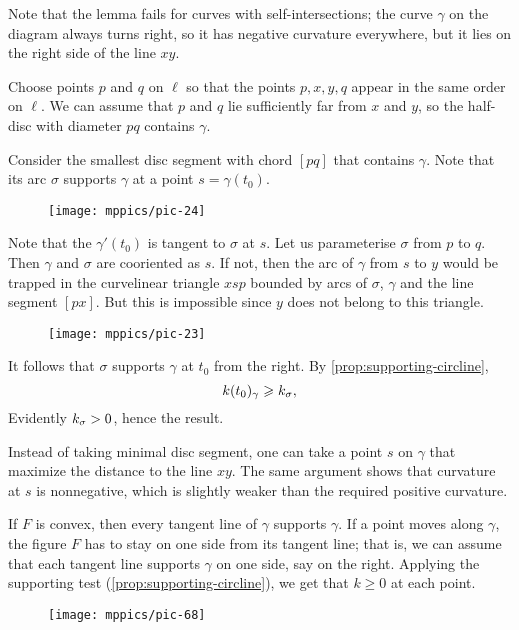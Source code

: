 Note that the lemma fails for curves with self-intersections;
the curve $\gamma$ on the diagram always turns right, 
so it has negative curvature everywhere, but it lies on the right side of the line $xy$.

Choose points $p$ and $q$ on $\ell$
so that the points $p, x, y, q$ appear in the same order on $\ell$.
We can assume that $p$ and $q$ lie sufficiently far from $x$ and $y$, so the half-disc with diameter $pq$ contains $\gamma$.

Consider the smallest disc segment with chord $[pq]$ that contains $\gamma$.
Note that its arc $\sigma$ supports $\gamma$ at a point $s=\gamma(t_0)$.

\begin{wrapfigure}{r}{50 mm}
\centering
\texttt{[image: mppics/pic-24]}
\vskip0mm
\end{wrapfigure}

Note that the $\gamma'(t_0)$ is tangent to $\sigma$ at $s$.
Let us parameterise $\sigma$ from $p$ to $q$.
Then $\gamma$ and $\sigma$ are cooriented as $s$.
If not, then the arc of $\gamma$ from $s$ to $y$ would be trapped in the curvelinear triangle $xsp$ bounded by arcs of $\sigma$, $\gamma$ and the line segment $[px]$.
But this is impossible since $y$ does not belong to this triangle.

\begin{wrapfigure}{r}{50 mm}
\centering
\texttt{[image: mppics/pic-23]}
\vskip0mm
\end{wrapfigure}

It follows that $\sigma$ supports $\gamma$ at $t_0$ from the right.
By \ref{prop:supporting-circline}, 
\[k(t_0)_\gamma\geqslant k_\sigma,\]
Evidently $k_\sigma>0$, hence the result.
\qeds

Instead of taking minimal disc segment, one can take a point $s$ on $\gamma$ that maximize the distance to the line $xy$.
The same argument shows that curvature at $s$ is nonnegative, which is slightly weaker than the required positive curvature.

If $F$ is convex, then every tangent line of $\gamma$ supports $\gamma$.
If a point moves along $\gamma$, the figure $F$ has to stay on one side from its tangent line;
that is, we can assume that each tangent line supports $\gamma$ on one side, say on the right.
Applying the supporting test (\ref{prop:supporting-circline}), we get that $k\ge 0$ at each point.

\begin{wrapfigure}{r}{35 mm}
\centering
\texttt{[image: mppics/pic-68]}
\vskip0mm
\end{wrapfigure}


